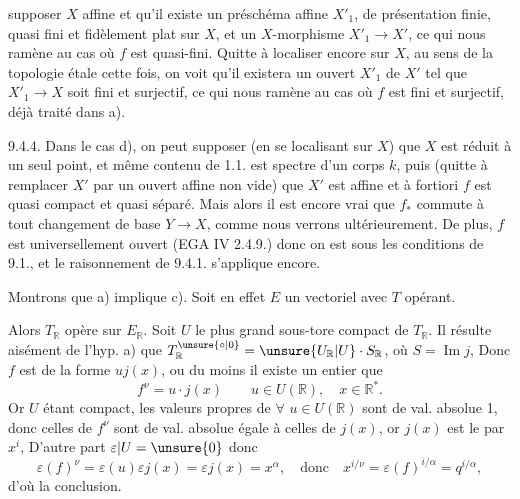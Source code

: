

supposer $X$ affine et qu'il existe un préschéma affine $X'_1$, de présentation finie, quasi fini et fidèlement plat sur $X$, et un $X$-morphisme $X'_1\longrightarrow X'$, ce qui nous ramène au cas où $f$ est quasi-fini. Quitte à localiser encore sur $X$, au sens de la topologie étale cette fois, on voit qu'il existera un ouvert $X'_1$ de $X'$ tel que $X'_1\longrightarrow X$ soit fini et surjectif, ce qui nous ramène au cas où $f$ est fini et surjectif, déjà traité dans a).

9.4.4. Dans le cas d), on peut supposer (en se localisant sur $X$) que $X$ est réduit à un seul point, et même contenu de 1.1.  est spectre d'un corps $k$, puis (quitte à remplacer $X'$ par un ouvert affine non vide) que $X'$ est affine et à fortiori $f$ est quasi compact et quasi séparé. Mais alors il est encore vrai que $f_*$ commute à tout changement de base $Y\longrightarrow X$, comme nous verrons ultérieurement. De plus, $f$ est universellement ouvert (EGA IV 2.4.9.) donc on est sous les conditions de 9.1., et le raisonnement de 9.4.1. s'applique encore.




 Montrons que a) implique c). Soit en effet  $E$ un vectoriel   avec $T$ opérant.


Alors $T_{\mathbb R}$ opère sur $E_{\mathbb R}$. Soit $U$ le plus grand sous-tore compact de $T_{\mathbb R}$. Il résulte aisément de l'hyp. a) que $T_{\mathbb R}^{\unsure{\circ|0}}=\unsure{U_{\mathbb R}|U}\cdot S_{\mathbb R}$, où $S=\operatorname{Im}j$,   Donc $f$ est de la forme $uj(x)$, ou du moins il existe un entier   que
\[
f^\nu=u\cdot j(x)\qquad u\in U(\mathbb R),\quad x\in\mathbb R^*.
\]
Or $U$ étant compact, les valeurs propres de $\forall$ $u\in U(\mathbb R)$ sont de val. absolue 1, donc celles de $f^\nu$ sont de val. absolue égale à celles de $j(x)$, or $j(x)$ est le    par $x^i$,  D'autre part  $\varepsilon|U=\unsure{0}$ donc
\[
\varepsilon(f)^\nu=\varepsilon(u)\varepsilon j(x)=\varepsilon j(x)=x^\alpha,
\quad\text{donc}\quad x^{i/\nu}=\varepsilon(f)^{i/\alpha}=q^{i/\alpha},
\]
d'où la conclusion.

